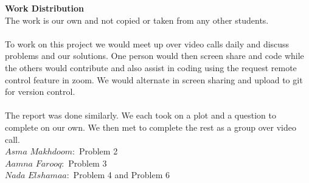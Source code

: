 \documentclass{article}
\theoremstyle{definition}
\begin{document}
\textbf{Work Distribution}
\\
The work is our own and not copied or taken from any other students. 
\\\\
To work on this project we would meet up over video calls daily and discuss problems and our solutions. One person would then screen share and code while the others would contribute and also assist in coding using the request remote control feature in zoom. We would alternate in screen sharing and upload to git for version control. 
\\\\
The report was done similarly. We each took on a plot and a question to complete on our own. We then met to complete the rest as a group over video call. 
\\
$Asma$ $Makhdoom:$ Problem 2
\\
$Aamna$ $Farooq:$ Problem 3
\\
$Nada$ $Elshamaa:$ Problem 4 and Problem 6
\\
\smallskip
\end{document}
